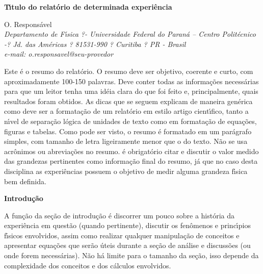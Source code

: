 \documentclass[twocolumn]{article}
\newcommand{\2}{\hspace{5mm}}
\newcommand{\5}{\vspace{5mm}}
\newcommand{\7}{\vspace{7mm}}
\begin{document}
\parindent 0mm
\begin{minipage}{18cm}
\begin{center}

{\Large \bf T\'{\i}tulo do relat\'orio de determinada experi\^encia} \\

\vspace{4mm}

{\large O. Respons\'avel} \\

{\it Departamento de F\'{\i}sica ?- Universidade Federal do Paran\'a 
-- Centro Polit\'ecnico -? Jd. das Am\'ericas ? 81531-990 ? Curitiba ? 
PR - Brasil \\ 
e-mail: o.responsavel@seu-provedor} \\

\vspace{1cm}

\begin{minipage}{14cm}
{\small \2 Este \'e o resumo do relat\'orio. O resumo deve ser objetivo, 
coerente e curto, com aproximadamente 100-150 palavras. Deve conter 
todas as informa\c{c}\~oes necess\'arias para que um leitor tenha uma 
id\'eia clara do que foi feito e, principalmente, quais resultados foram 
obtidos. As dicas que se seguem explicam de maneira gen\'erica como deve 
ser a formata\c{c}\~ao de um relat\'orio em estilo artigo cient\'{\i}fico, 
tanto a n\'{\i}vel de separa\c{c}\~ao l\'ogica de unidades de texto como 
em formata\c{c}\~ao de equa\c{c}\~oes, figuras e tabelas. Como pode ser 
visto, o resumo \'e formatado em um par\'agrafo simples, com tamanho de 
letra ligeiramente menor que o do texto. N\~ao se usa acr\^onimos ou 
abrevia\c{c}\~oes no resumo. \'e obrigat\'orio citar e discutir o valor 
medido das grandezas pertinentes como informa\c{c}\~ao final do resumo, 
j\'a que no caso desta disciplina as experi\^encias possuem o objetivo 
de medir alguma grandeza f\'{\i}sica bem definida.}

\end{minipage}
\end{center} 

\end{minipage}
\7

{\bf Introdu\c{c}\~ao}

\5

\2 A fun\c{c}\~ao da se\c{c}\~ao de introdu\c{c}\~ao \'e discorrer um 
pouco sobre a hist\'oria da experi\^encia em quest\~ao (quando pertinente), 
discutir os fen\^omenos e princ\'{\i}pios f\'{\i}sicos envolvidos, assim 
como realizar qualquer manipula\c{c}\~ao de conceitos e apresentar 
equa\c{c}\~oes que ser\~ao \'uteis durante a se\c{c}\~ao de an\'alise e 
discuss\~oes (ou onde forem necess\'arias). N\~ao h\'a limite para o 
tamanho da se\c{c}\~ao, isso depende da complexidade dos conceitos e dos 
c\'alculos envolvidos. 
\end{document}
